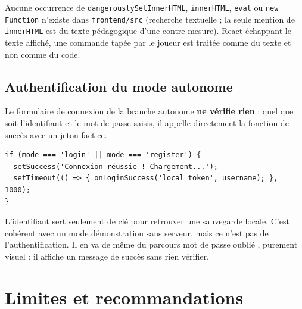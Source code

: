 \documentclass[11pt,a4paper]{report}
\newcommand{\file}[1]{\texttt{\nolinkurl{#1}}}
\begin{document}
Aucune occurrence de \texttt{dangerouslySetInnerHTML}, \texttt{innerHTML}, \texttt{eval}
ou \texttt{new Function} n'existe dans \file{frontend/src} (recherche textuelle ; la seule
mention de \texttt{innerHTML} est du texte p\'edagogique d'une contre-mesure). React
\'echappant le texte affich\'e, une commande tap\'ee par le joueur est trait\'ee comme du
texte et non comme du code.

\subsection{Authentification du mode autonome}

Le formulaire de connexion de la branche autonome \textbf{ne v\'erifie rien} : quel que
soit l'identifiant et le mot de passe saisis, il appelle directement la fonction de succ\`es
avec un jeton factice.

\begin{lstlisting}[style=js,caption={Soumission du formulaire (\file{AuthForm.jsx})}]
if (mode === 'login' || mode === 'register') {
  setSuccess('Connexion réussie ! Chargement...');
  setTimeout(() => { onLoginSuccess('local_token', username); }, 1000);
}
\end{lstlisting}

L'identifiant sert seulement de cl\'e pour retrouver une sauvegarde locale. C'est
coh\'erent avec un mode d\'emonstration sans serveur, mais ce n'est pas de
l'authentification. Il en va de m\^eme du parcours \og mot de passe oubli\'e \fg, purement
visuel : il affiche un message de succ\`es sans rien v\'erifier.

\section{Limites et recommandations}
\label{sec:limites-secu}
\end{document}

